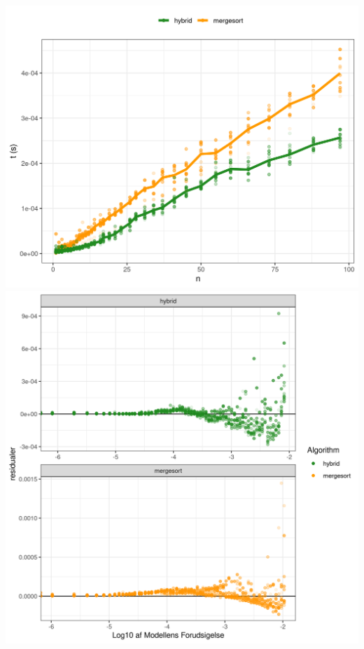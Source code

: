 \centering
\includegraphics[scale=1]{../img/toMergesortZoomed(BIG).png}
\newpage
\centering
\includegraphics[scale=1]{../img/toMergesortResidual(BIG).png}


